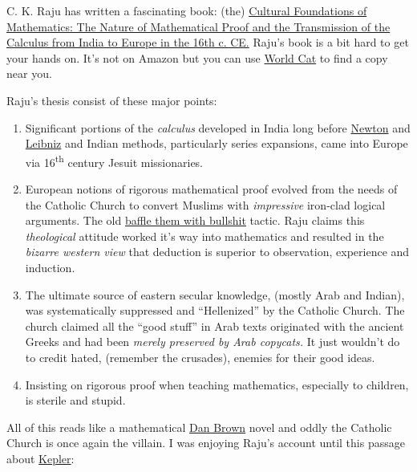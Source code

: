 C. K. Raju has written a fascinating book: (the)
\href{http://books.google.com/books?id=jza\_cNJM6fAC\&pg=PA379\&lpg=PA379\&dq=C.+K.+Raju+Criticism\&source=bl\&ots=HEEAXlWhtW\&sig=7n3w6VnpLlYx2rQIMq7Lsa9uOcc\&hl=en\&ei=YY9hTNCvFMKBlAfdmcmLCw\&sa=X\&oi=book\_result\&ct=result\&resnum=5\&ved=0CCQQ6AEwBA\#v=onepage\&q\&f=false}{Cultural
Foundations of Mathematics: The Nature of Mathematical Proof and the
Transmission of the Calculus from India to Europe in the 16th c. CE.}
Raju's book is a bit hard to get your hands on. It's not on Amazon but
you can use \href{http://www.worldcat.org/}{World Cat} to find a copy
near you.

Raju's thesis consist of these major points:

\begin{enumerate}
\item
  Significant portions of the \emph{calculus} developed in India long
  before \href{http://en.wikipedia.org/wiki/Isaac\_Newton}{Newton} and
  \href{http://en.wikipedia.org/wiki/Gottfried\_Leibniz}{Leibniz} and
  Indian methods, particularly series expansions, came into Europe via
  16\textsuperscript{th} century Jesuit missionaries.
\item
  European notions of rigorous mathematical proof evolved from the needs
  of the Catholic Church to convert Muslims with
  \emph{impressive} iron-clad logical arguments. The old
  \href{http://writing2.richmond.edu/training/383/383restricted/bullshit.pdf}{baffle
  them with bullshit} tactic. Raju claims this \emph{theological}
  attitude worked it's way into mathematics and resulted in the
  \emph{bizarre western view} that deduction is superior to observation,
  experience and induction.
\item
  The ultimate source of eastern secular knowledge, (mostly Arab and
  Indian), was systematically suppressed and ``Hellenized'' by the
  Catholic Church. The church claimed all the ``good stuff'' in Arab
  texts originated with the ancient Greeks and had been \emph{merely
  preserved by Arab copycats.} It just wouldn't do to credit hated,
  (remember the crusades), enemies for their good ideas.
\item
  Insisting on rigorous proof when teaching mathematics, especially to
  children, is sterile and stupid.
\end{enumerate}
All of this reads like a mathematical
\href{http://www.danbrown.com/\#/home}{Dan Brown} novel and oddly the
Catholic Church is once again the villain. I was enjoying Raju's account
until this passage about
\href{http://en.wikipedia.org/wiki/Johannes\_Kepler}{Kepler}:


